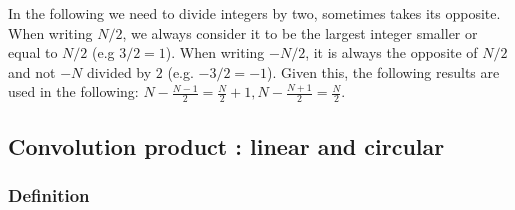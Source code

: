 \documentclass[a4paper,10pt,twoside]{article}
\begin{document}
In the following we need to divide integers by two, sometimes takes its opposite. When writing $N/2$, we always consider it to be the largest integer smaller or equal to $N/2$ (e.g $3/2=1$). When writing $-N/2$, it is always the opposite of $N/2$ and not $-N$ divided by $2$ (e.g. $-3/2=-1$). Given this, the following results are used in the following: $N-\frac{N-1}{2}=\frac{N}{2}+1, N-\frac{N+1}{2}=\frac{N}{2}$.\\

\subsection{Convolution product : linear and circular}

\subsubsection{Definition}
\end{document}
